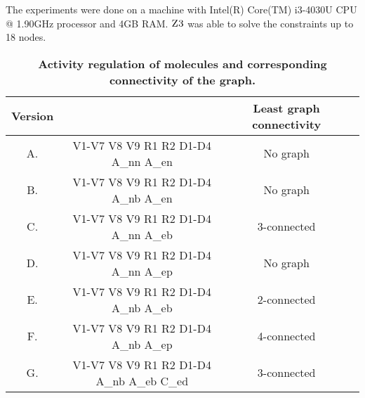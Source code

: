 The experiments were done on a machine with Intel(R) Core(TM) i3-4030U CPU @ 1.90GHz processor 
and 4GB RAM.
%
$\textsc{Z3}$ was able to solve the constraints up to 18 nodes.
%


\begin{table}[!ht]
\centering
\def\arraystretch{1.6}
\caption{
{\bf Activity regulation of molecules and corresponding connectivity of the graph.}}
  \begin{tabular}{|c|c|c|c|}
    \hline
  {\textbf{Version}}  & {\textbf{Constraints} &  {\textbf{Least graph connectivity}}  \\
    \hline
    
    A. & V1-V7 V8 V9 R1 R2 D1-D4 A\_nn A\_en & No graph  \\ \hline
B. & V1-V7 V8 V9 R1 R2 D1-D4 A\_nb A\_en & No graph  \\ \hline
C. & V1-V7 V8 V9 R1 R2 D1-D4 A\_nn A\_eb & 3-connected  \\  \hline
D. & V1-V7 V8 V9 R1 R2 D1-D4 A\_nn A\_ep & No graph  \\ \hline
E. & V1-V7 V8 V9 R1 R2 D1-D4 A\_nb A\_eb & 2-connected  \\ \hline
F. & V1-V7 V8 V9 R1 R2 D1-D4 A\_nb A\_ep & 4-connected  \\ \hline
G. & V1-V7 V8 V9 R1 R2 D1-D4 A\_nb A\_eb C\_ed & 3-connected \\ \hline


  \end{tabular}
\label{table1}
\end{table}



